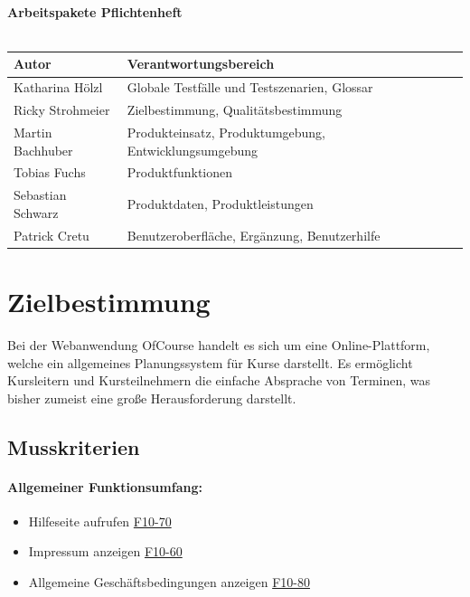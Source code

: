 \documentclass[a4paper]{scrreprt}
\begin{document}
\begin{titlepage}
\begin{center}
        \ \\
        \ \\
        \hspace{3 cm}\\
          \textbf{Arbeitspakete Pflichtenheft} \\
          \ \\
        
        \begin{tabular}{ | l | l |}
        	\hline
        	\textbf{Autor} & \textbf{Verantwortungsbereich} \\ \hline
        	 Katharina Hölzl & Globale Testfälle und Testszenarien, Glossar  \\ \hline
        	 Ricky Strohmeier& Zielbestimmung, Qualitätsbestimmung  \\ \hline
        	 Martin Bachhuber & Produkteinsatz, Produktumgebung, Entwicklungsumgebung  \\ \hline
	         Tobias Fuchs & Produktfunktionen \\ \hline
        	 Sebastian Schwarz & Produktdaten, Produktleistungen \\ \hline  
	         Patrick Cretu  &  Benutzeroberfläche, Ergänzung, Benutzerhilfe  \\ \hline
        \end{tabular}
    \end{center}
\end{titlepage}
 
 


\tableofcontents
 
\chapter{Zielbestimmung}
	   Bei der Webanwendung OfCourse handelt es sich um eine Online-Plattform, welche ein allgemeines Planungssystem für Kurse darstellt. Es ermöglicht Kursleitern und Kursteilnehmern die einfache Absprache von Terminen, was bisher zumeist eine große Herausforderung darstellt.
    \section{Musskriterien}      
    	\subsubsection{Allgemeiner Funktionsumfang:}
      		\begin{itemize}
	      		\item Hilfeseite aufrufen \hyperlink{hilfeSeite}{F10-70}
	      		\item Impressum anzeigen \hyperlink{impressum}{F10-60}
	      		\item Allgemeine Geschäftsbedingungen anzeigen \hyperlink{agb}{F10-80}
      		\end{itemize}
\end{document}
